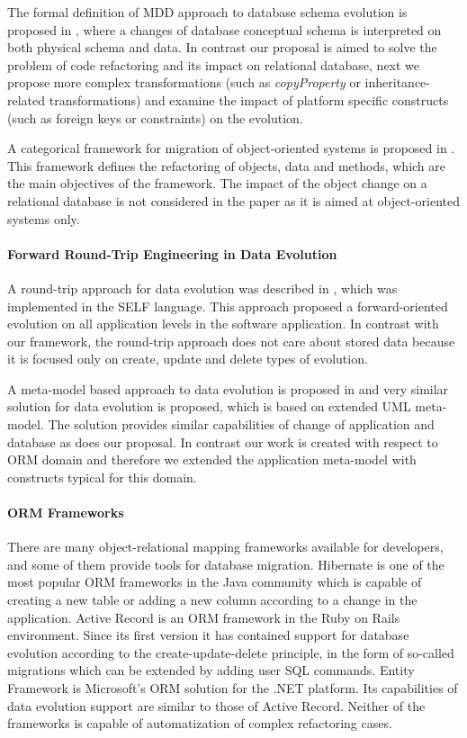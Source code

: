 \documentclass[runningheads]{comsis}
\begin{document}
The formal definition of MDD approach to database schema evolution is proposed in \cite{Aboulsamh:FormalModelingEvolution}, where a changes of database conceptual schema is interpreted on both physical schema and data. In contrast our proposal is aimed to solve the problem of code refactoring and its impact on relational database, next we propose more complex transformations (such as \emph{copyProperty} or inheritance-related transformations) and examine the impact of platform specific constructs (such as foreign keys or constraints) on the evolution. 

A categorical framework for migration of object-oriented systems is proposed in \cite{Schulz:CategoricalModel}. This framework defines the refactoring of objects, data and methods, which are the main objectives of the framework. The impact of the object change on a relational database is not considered in the paper as it is aimed at object-oriented systems only.

\paragraph{Forward Round-Trip Engineering in Data Evolution} A round-trip approach for data evolution was described in \cite{VanPaesschen:2005to}, which was implemented in the SELF language. This approach proposed a forward-oriented evolution on all application levels in the software application. In contrast with our framework, the round-trip approach does not care about stored data because it is focused only on create, update and delete types of evolution.

A meta-model based approach to data evolution is proposed in \cite{Aboulsamh:MetaModelBasedApproachToIsDataEvolution} and very similar solution for data evolution is proposed, which is based on extended UML meta-model. The solution provides similar capabilities of change of application and database as does our proposal. In contrast our work is created with respect to ORM domain and therefore we extended the application meta-model with constructs typical for this domain.

\paragraph{ORM Frameworks} There are many object-relational mapping frameworks available for developers, and some of them provide tools for database migration. Hibernate \cite{Hibernate} is one of the most popular ORM frameworks in the Java community which is capable of creating a new table or adding a new column according to a change in the application. Active Record \cite{Active_Record} is an ORM framework in the Ruby on Rails environment. Since its first version it has contained support for database evolution according to the create-update-delete principle, in the form of so-called migrations \cite{Rails:Migrations} which can be extended by adding user SQL commands. Entity Framework \cite{Entity_Framework} is Microsoft's ORM solution for the .NET platform. Its capabilities of data evolution support are similar to those of Active Record. Neither of the frameworks is capable of automatization of complex refactoring cases.
\end{document}
